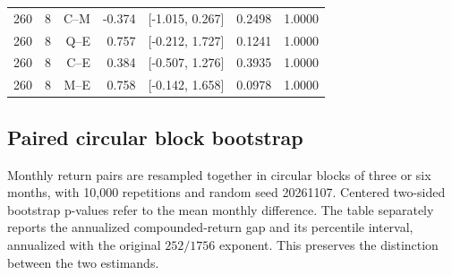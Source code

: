 \begin{longtable}{@{}lrrrrrr@{}}
260 & 8 & C--M & -0.374 & [-1.015, 0.267] & 0.2498 & 1.0000\\

260 & 8 & Q--E & 0.757 & [-0.212, 1.727] & 0.1241 & 1.0000\\

260 & 8 & C--E & 0.384 & [-0.507, 1.276] & 0.3935 & 1.0000\\

260 & 8 & M--E & 0.758 & [-0.142, 1.658] & 0.0978 & 1.0000\\

\end{longtable}\endgroup

\clearpage\subsection{Paired circular block bootstrap}
Monthly return pairs are resampled together in circular blocks of three or six months, with 10,000 repetitions and random seed 20261107. Centered two-sided bootstrap p-values refer to the mean monthly difference. The table separately reports the annualized compounded-return gap and its percentile interval, annualized with the original $252/1756$ exponent. This preserves the distinction between the two estimands.

\begingroup\footnotesize\setlength{\tabcolsep}{4pt}\renewcommand{\arraystretch}{1.1}

